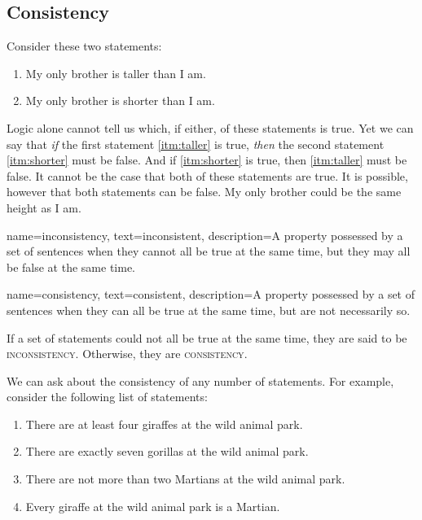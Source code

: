 
\subsection{Consistency}
Consider these two statements:

\begin{enumerate}[label=(\alph*)]
\item \label{itm:taller} My only brother is taller than I am.
\item \label{itm:shorter} My only brother is shorter than I am.
\end{enumerate}

Logic alone cannot tell us which, if either, of these statements is true. Yet we can say that \emph{if} the first statement \ref{itm:taller} is true, \emph{then} the second statement \ref{itm:shorter} must be false. And if \ref{itm:shorter}  is true, then \ref{itm:taller} must be false. It cannot be the case that both of these statements are true. It is possible, however that both statements can be false. My only brother could be the same height as I am. 

{
name=inconsistency,
text={inconsistent},
description={A property possessed by a set of sentences when they cannot all be true at the same time, but they may all be false at the same time.}
}

{
name=consistency,
text={consistent},
description={A property possessed by a set of sentences when they can all be true at the same time, but are not necessarily so.}
}

If a set of statements could not all be true at the same time, they are said to be \textsc{\gls{inconsistency}}. \label{def:inconsistency} Otherwise, they are \textsc{\gls{consistency}}. \label{def:consistency} 

We can ask about the consistency of any number of statements. For example, consider the following list of statements:

\label{MartianGiraffes}
\begin{enumerate}[label=(\alph*)]
\item \label{itm:at_least_four}There are at least four giraffes at the wild animal park.
\item \label{itm:exactly_seven} There are exactly seven gorillas at the wild animal park.
\item \label{itm:not_more_than_two} There are not more than two Martians at the wild animal park.
\item \label{itm:martians} Every giraffe at the wild animal park is a Martian.
\end{enumerate}

